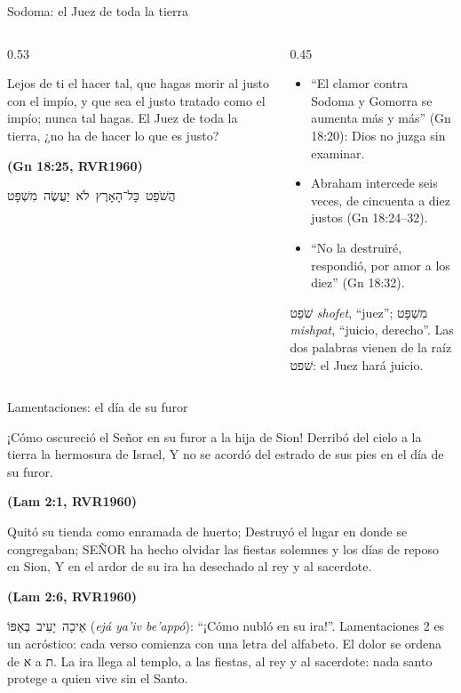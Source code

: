 \documentclass[hyperref={bookmarks=false},aspectratio=169]{beamer}
\newcommand{\heb}[1]{\mbox{\foreignlanguage{hebrew}{#1}}}
\newcommand{\SENOR}{S{\fontsize{0.78em}{1em}\selectfont EÑOR}}
\newcommand{\fuente}[1]{\par\hfill{\upshape\bfseries\footnotesize\textcolor{azul}{#1}}}
\begin{document}
\begin{frame}{Sodoma: el Juez de toda la tierra}
\begin{columns}[t,onlytextwidth]
\begin{column}{0.53\textwidth}
\begin{cita}Lejos de ti el hacer tal, que hagas morir al justo con el impío, y que sea el justo tratado como el impío; nunca tal hagas. El Juez de toda la tierra, ¿no ha de hacer lo que es justo?\fuente{(Gn 18:25, RVR1960)}\end{cita}
\begin{center}\heb{הֲשֹׁפֵט כָּל־הָאָרֶץ לֹא יַעֲשֶׂה מִשְׁפָּט}\end{center}
\end{column}
\begin{column}{0.45\textwidth}\small
\begin{itemize}
\item ``El clamor contra Sodoma y Gomorra se aumenta más y más'' (Gn 18:20): Dios no juzga sin examinar.
\item Abraham intercede seis veces, de cincuenta a diez justos (Gn 18:24--32).
\item ``No la destruiré, respondió, por amor a los diez'' (Gn 18:32).
\end{itemize}
\scriptsize\heb{שֹׁפֵט} \emph{shofet}, ``juez''; \heb{מִשְׁפָּט} \emph{mishpat}, ``juicio, derecho''. Las dos palabras vienen de la raíz \heb{שׁפט}: el Juez hará juicio.
\end{column}
\end{columns}
\end{frame}

\begin{frame}{Lamentaciones: el día de su furor}
\begin{cita}¡Cómo oscureció el Señor en su furor a la hija de Sion! Derribó del cielo a la tierra la hermosura de Israel, Y no se acordó del estrado de sus pies en el día de su furor.\fuente{(Lam 2:1, RVR1960)}\end{cita}
\begin{cita}Quitó su tienda como enramada de huerto; Destruyó el lugar en donde se congregaban; \SENOR{} ha hecho olvidar las fiestas solemnes y los días de reposo en Sion, Y en el ardor de su ira ha desechado al rey y al sacerdote.\fuente{(Lam 2:6, RVR1960)}\end{cita}
\scriptsize\heb{אֵיכָה יָעִיב בְּאַפּוֹ} (\emph{ejá ya'iv be'appó}): ``¡Cómo nubló en su ira!''. Lamentaciones 2 es un acróstico: cada verso comienza con una letra del alfabeto. El dolor se ordena de \heb{א} a \heb{ת}. La ira llega al templo, a las fiestas, al rey y al sacerdote: nada santo protege a quien vive sin el Santo.
\end{frame}
\end{document}
